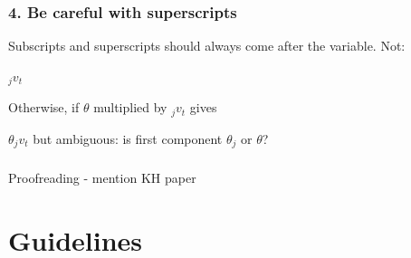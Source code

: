 
\begin{frame}
\frametitle{4. Be careful with superscripts}
Subscripts and superscripts should always come after the variable. Not:
\bi
  \item $_jv_t$
\ei

Otherwise, if $\theta$ multiplied by $_jv_t$ gives
\bi
  \item $\theta_jv_t$
\ei
but ambiguous: is first component $\theta_j$ or $\theta$?


\end{frame}


\begin{frame}
\frametitle{}
\bi
  \item
\ei
\end{frame}


\begin{frame}
\frametitle{}
\bi
  \item
\ei
\end{frame}


\begin{frame}
\frametitle{}
\bi
  \item
\ei
\end{frame}


\begin{frame}
\frametitle{}
\bi
  \item
\ei
\end{frame}







Proofreading - mention KH paper





\section*{Guidelines}






